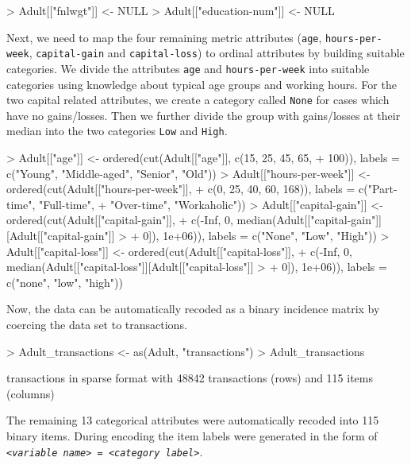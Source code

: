 \documentclass[10pt,a4paper]{article}
\newcommand{\class}[1]{\textsf{#1}}
\newcommand{\code}[1]{\texttt{#1}}
\begin{document}
\begin{Schunk}
\begin{Sinput}
> Adult[["fnlwgt"]] <- NULL
> Adult[["education-num"]] <- NULL
\end{Sinput}
\end{Schunk}

Next, we need to map the four remaining metric attributes (\code{age},
\code{hours-per-week}, \code{capital-gain} and \code{capital-loss}) to ordinal
attributes by building suitable categories.
We divide the attributes \code{age} and \code{hours-per-week}
into suitable categories using knowledge about typical age groups 
and working hours. 
For the two capital related attributes,
we create a category called \code{None} 
for cases which have no gains/losses. 
Then we further divide the group with gains/losses
at their median into the two categories \code{Low} and \code{High}.


\begin{Schunk}
\begin{Sinput}
> Adult[["age"]] <- ordered(cut(Adult[["age"]], c(15, 25, 45, 65, 
+     100)), labels = c("Young", "Middle-aged", "Senior", "Old"))
> Adult[["hours-per-week"]] <- ordered(cut(Adult[["hours-per-week"]], 
+     c(0, 25, 40, 60, 168)), labels = c("Part-time", "Full-time", 
+     "Over-time", "Workaholic"))
> Adult[["capital-gain"]] <- ordered(cut(Adult[["capital-gain"]], 
+     c(-Inf, 0, median(Adult[["capital-gain"]][Adult[["capital-gain"]] > 
+         0]), 1e+06)), labels = c("None", "Low", "High"))
> Adult[["capital-loss"]] <- ordered(cut(Adult[["capital-loss"]], 
+     c(-Inf, 0, median(Adult[["capital-loss"]][Adult[["capital-loss"]] > 
+         0]), 1e+06)), labels = c("none", "low", "high"))
\end{Sinput}
\end{Schunk}

Now, the data can be automatically recoded as
a binary incidence matrix by coercing the data set to
\class{transactions}.

\begin{Schunk}
\begin{Sinput}
> Adult_transactions <- as(Adult, "transactions")
> Adult_transactions
\end{Sinput}
\begin{Soutput}
transactions in sparse format with
 48842 transactions (rows) and
 115 items (columns)
\end{Soutput}
\end{Schunk}

The remaining 13 categorical attributes were
automatically recoded into 115
binary items. During encoding the item labels were generated in the
form of 
\texttt{<\emph{variable name}> = <\emph{category label}>}.
\end{document}
